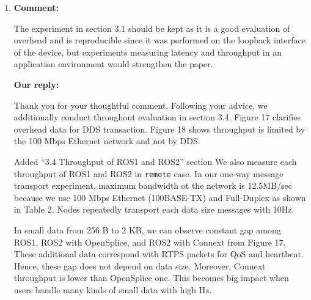\documentclass{article}
\begin{document}
\begin{enumerate}
\item \begin{flushleft}
    \textbf{Comment:}
  \end{flushleft}
  The experiment in section 3.1 should be kept as it is a good evaluation of overhead and is reproducible since it was performed on the loopback interface of the device, but experiments measuring latency and throughput in an application environment would strengthen the paper.

  \begin{flushleft}
    \textbf{Our reply:}
  \end{flushleft}
  Thank you for your thoughtful comment. 
  Following your advice, we additionally conduct throughout evaluation in section 3.4.
  Figure 17 clarifies overhead data for DDS transaction.
  Figure 18 shows throughput is limited by the 100 Mbps Ethernet network and not by DDS.
  \begin{itembox}[|]{Added ``3.4 Throughput of ROS1 and ROS2'' section}
    We also measure each throughput of ROS1 and ROS2 in \texttt{remote} case.
    In our one-way message transport experiment, maximum bandwidth ot the network is 12.5MB/sec because we use 100 Mbps Ethernet (100BASE-TX) and Full-Duplex as shown in Table 2.
    Nodes repeatedly transport each data size messages with 10Hz.

    In small data from 256 B to 2 KB, we can observe constant gap among ROS1, ROS2 with OpenSplice, and ROS2 with Connext from Figure 17.
    These additional data correspond with RTPS packets for QoS and heartbeat.
    Hence, these gap does not depend on data size.
    Moreover, Connext throughput is lower than OpenSplice one.
    This becomes big impact when users handle many kinds of small data with high Hz.


\end{itembox}
\end{enumerate}
\end{document}
